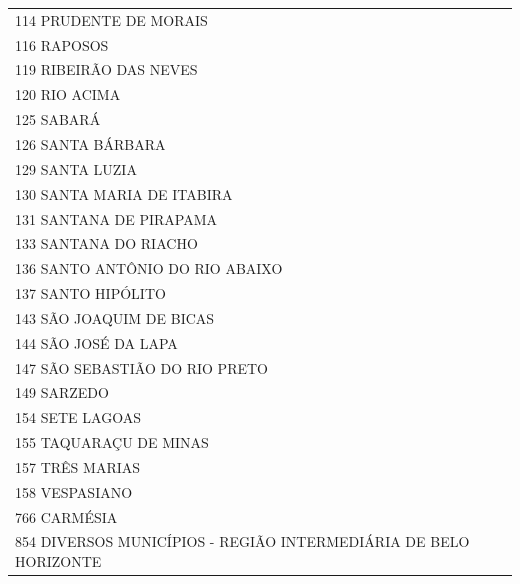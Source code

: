 \documentclass{article}
\begin{document}
\begin{longtable}[c]{m{18cm}}
\multicolumn{1}{l}{ \hspace{2em} 114 PRUDENTE DE MORAIS } \\
\multicolumn{1}{l}{ \hspace{2em} 116 RAPOSOS } \\
\multicolumn{1}{l}{ \hspace{2em} 119 RIBEIRÃO DAS NEVES } \\
\multicolumn{1}{l}{ \hspace{2em} 120 RIO ACIMA } \\
\multicolumn{1}{l}{ \hspace{2em} 125 SABARÁ } \\
\multicolumn{1}{l}{ \hspace{2em} 126 SANTA BÁRBARA } \\
\multicolumn{1}{l}{ \hspace{2em} 129 SANTA LUZIA } \\
\multicolumn{1}{l}{ \hspace{2em} 130 SANTA MARIA DE ITABIRA } \\
\multicolumn{1}{l}{ \hspace{2em} 131 SANTANA DE PIRAPAMA } \\
\multicolumn{1}{l}{ \hspace{2em} 133 SANTANA DO RIACHO } \\
\multicolumn{1}{l}{ \hspace{2em} 136 SANTO ANTÔNIO DO RIO ABAIXO } \\
\multicolumn{1}{l}{ \hspace{2em} 137 SANTO HIPÓLITO } \\
\multicolumn{1}{l}{ \hspace{2em} 143 SÃO JOAQUIM DE BICAS } \\
\multicolumn{1}{l}{ \hspace{2em} 144 SÃO JOSÉ DA LAPA } \\
\multicolumn{1}{l}{ \hspace{2em} 147 SÃO SEBASTIÃO DO RIO PRETO } \\
\multicolumn{1}{l}{ \hspace{2em} 149 SARZEDO } \\
\multicolumn{1}{l}{ \hspace{2em} 154 SETE LAGOAS } \\
\multicolumn{1}{l}{ \hspace{2em} 155 TAQUARAÇU DE MINAS } \\
\multicolumn{1}{l}{ \hspace{2em} 157 TRÊS MARIAS } \\
\multicolumn{1}{l}{ \hspace{2em} 158 VESPASIANO } \\
\multicolumn{1}{l}{ \hspace{2em} 766 CARMÉSIA } \\
\multicolumn{1}{l}{ \hspace{2em} 854 DIVERSOS MUNICÍPIOS - REGIÃO INTERMEDIÁRIA DE BELO HORIZONTE } \\
\end{longtable}
\end{document}
